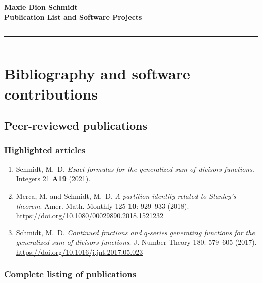 \documentclass[10pt,reqno,letterpaper]{article}
\theoremstyle{plain}
\numberwithin{theorem}{section}
\theoremstyle{definition}
\renewcommand{\thesection}{\arabic{section}}
\begin{document}
\noindent 
{\bfseries\Large Maxie Dion Schmidt} \\[0.5ex]
{\bfseries\Large Publication List and Software Projects} \\ 
\hrule\hrule\hrule\medskip

\renewcommand{\thesection}{B}
\section{Bibliography and software contributions} 
\label{page_Section_BibliographyB} 

\vskip 0.1in
\subsection{Peer-reviewed publications} 
\label{page_BibliographyB_subSection_MDSPubs} 

\vskip 0.35cm

\subsubsection*{Highlighted articles} 

\begin{enumerate}
     \setlength{\itemsep}{-1mm} 

\item 
Schmidt, M.~D. \emph{Exact formulas for the generalized sum-of-divisors functions}. 
Integers 21 {\bf A19} (2021). 
\item 
Merca, M. and Schmidt, M.~D. \emph{A partition identity related to Stanley's theorem}. 
Amer. Math. Monthly 125 {\bf 10}: 929--933 (2018). 
\url{https://doi.org/10.1080/00029890.2018.1521232}
\item 
Schmidt, M.~D. \emph{Continued fractions and $q$-series generating functions for the 
                     generalized sum-of-divisors functions}. 
J. Number Theory 180: 579--605 (2017). 
\url{https://doi.org/10.1016/j.jnt.2017.05.023}

\end{enumerate} 

\subsubsection*{Complete listing of publications} 

\vskip -0.35cm 
\end{document}

